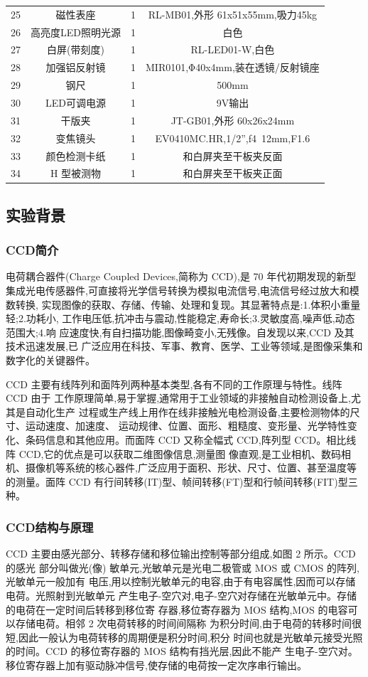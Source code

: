 \documentclass{ctexart}
\begin{document}
\begin{tabular}{c|c|c|c}
        25 & 磁性表座 &1&RL-MB01,外形 61x51x55mm,吸力45kg\\
        26&  高亮度LED照明光源 &1&白色\\
        27 &  白屏(带刻度) &1&RL-LED01-W,白色\\
        28 &  加强铝反射镜 &1&MIR0101,Φ40x4mm,装在透镜/反射镜座\\
        29 &  钢尺 &1& 500mm\\
        30& LED可调电源 &1&9V输出 \\
        31& 干版夹 &1& JT-GB01,外形 60x26x24mm\\
        32& 变焦镜头 &1& EV0410MC.HR,1/2”,f4~12mm,F1.6 \\
        33&颜色检测卡纸&1&和白屏夹至干板夹反面\\
        34&H 型被测物&1&和白屏夹至干板夹正面 \\
	\hline        
\end{tabular}
\subsection{实验背景}
\subsubsection{CCD简介}
电荷耦合器件(Charge Coupled Devices,简称为 CCD),是 70 年代初期发现的新型
集成光电传感器件,可直接将光学信号转换为模拟电流信号,电流信号经过放大和模数转换,
实现图像的获取、存储、传输、处理和复现。其显著特点是:1.体积小重量轻;2.功耗小,
工作电压低,抗冲击与震动,性能稳定,寿命长;3.灵敏度高,噪声低,动态范围大;4.响
应速度快,有自扫描功能,图像畸变小,无残像。自发现以来,CCD 及其技术迅速发展,已
广泛应用在科技、军事、教育、医学、工业等领域,是图像采集和数字化的关键器件。

CCD 主要有线阵列和面阵列两种基本类型,各有不同的工作原理与特性。线阵 CCD 由于
工作原理简单,易于掌握,通常用于工业领域的非接触自动检测设备上,尤其是自动化生产
过程或生产线上用作在线非接触光电检测设备,主要检测物体的尺寸、运动速度、加速度、
运动规律、位置、面形、粗糙度、变形量、光学特性变化、条码信息和其他应用。而面阵 CCD
又称全幅式 CCD,阵列型 CCD。相比线阵 CCD,它的优点是可以获取二维图像信息,测量图
像直观,是工业相机、数码相机、摄像机等系统的核心器件,广泛应用于面积、形状、尺寸、位置、甚至温度等的测量。面阵 CCD 有行间转移(IT)型、帧间转移(FT)型和行帧间转移(FIT)型三种。
\subsubsection{CCD结构与原理}
CCD 主要由感光部分、转移存储和移位输出控制等部分组成,如图 2 所示。CCD 的感光
部分叫做光(像) 敏单元,光敏单元是光电二极管或 MOS 或 CMOS 的阵列,光敏单元一般加有
电压,用以控制光敏单元的电容,由于有电容属性,因而可以存储电荷。光照射到光敏单元
产生电子-空穴对,电子-空穴对存储在光敏单元中。存储的电荷在一定时间后转移到移位寄
存器,移位寄存器为 MOS 结构,MOS 的电容可以存储电荷。相邻 2 次电荷转移的时间间隔称
为积分时间,由于电荷的转移时间很短,因此一般认为电荷转移的周期便是积分时间,积分
时间也就是光敏单元接受光照的时间。CCD 的移位寄存器的 MOS 结构有挡光层,因此不能产
生电子-空穴对。移位寄存器上加有驱动脉冲信号,使存储的电荷按一定次序串行输出。
\end{document}
